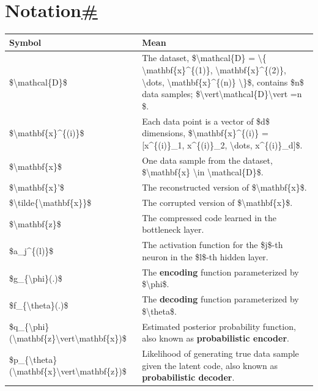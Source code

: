 \section{\texorpdfstring{Notation\hyperref[notation]{\#}}{Notation\#}}\label{notation}

\begin{longtable}[]{@{}ll@{}}
\toprule\noalign{}
Symbol & Mean \\
\midrule\noalign{}
\endhead
\bottomrule\noalign{}
\endlastfoot
\$\textbackslash mathcal\{D\}\$ & The dataset, \$\textbackslash mathcal\{D\} = \textbackslash\{ \textbackslash mathbf\{x\}\^{}\{(1)\}, \textbackslash mathbf\{x\}\^{}\{(2)\}, \textbackslash dots, \textbackslash mathbf\{x\}\^{}\{(n)\} \textbackslash\}\$, contains \$n\$ data samples; \$\textbackslash vert\textbackslash mathcal\{D\}\textbackslash vert =n \$. \\
\$\textbackslash mathbf\{x\}\^{}\{(i)\}\$ & Each data point is a vector of \$d\$ dimensions, \$\textbackslash mathbf\{x\}\^{}\{(i)\} = {[}x\^{}\{(i)\}\_1, x\^{}\{(i)\}\_2, \textbackslash dots, x\^{}\{(i)\}\_d{]}\$. \\
\$\textbackslash mathbf\{x\}\$ & One data sample from the dataset, \$\textbackslash mathbf\{x\} \textbackslash in \textbackslash mathcal\{D\}\$. \\
\$\textbackslash mathbf\{x\}'\$ & The reconstructed version of \$\textbackslash mathbf\{x\}\$. \\
\$\textbackslash tilde\{\textbackslash mathbf\{x\}\}\$ & The corrupted version of \$\textbackslash mathbf\{x\}\$. \\
\$\textbackslash mathbf\{z\}\$ & The compressed code learned in the bottleneck layer. \\
\$a\_j\^{}\{(l)\}\$ & The activation function for the \$j\$-th neuron in the \$l\$-th hidden layer. \\
\$g\_\{\textbackslash phi\}(.)\$ & The \textbf{encoding} function parameterized by \$\textbackslash phi\$. \\
\$f\_\{\textbackslash theta\}(.)\$ & The \textbf{decoding} function parameterized by \$\textbackslash theta\$. \\
\$q\_\{\textbackslash phi\}(\textbackslash mathbf\{z\}\textbackslash vert\textbackslash mathbf\{x\})\$ & Estimated posterior probability function, also known as \textbf{probabilistic encoder}. \\
\$p\_\{\textbackslash theta\}(\textbackslash mathbf\{x\}\textbackslash vert\textbackslash mathbf\{z\})\$ & Likelihood of generating true data sample given the latent code, also known as \textbf{probabilistic decoder}. \\
\end{longtable}

